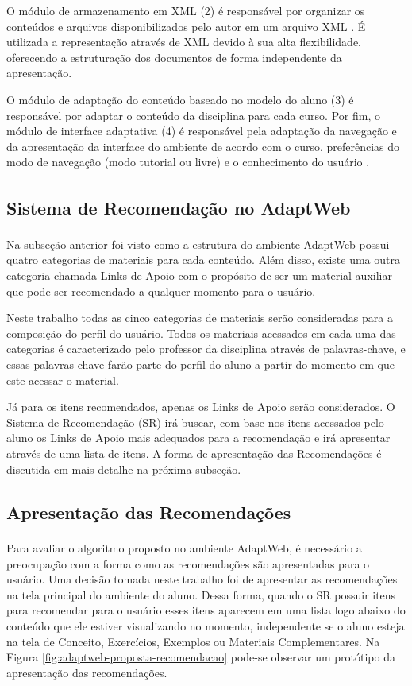 O módulo de armazenamento em XML (2) é responsável por organizar os conteúdos e arquivos disponibilizados pelo autor em
um arquivo XML \cite{gasparini2003interface}. É utilizada a representação através de XML devido à sua alta
flexibilidade, oferecendo a estruturação dos documentos de forma independente da apresentação.

O módulo de adaptação do conteúdo baseado no modelo do aluno (3) é responsável por adaptar o conteúdo da disciplina
para cada curso. Por fim, o módulo de interface adaptativa (4) é responsável pela adaptação da navegação e da
apresentação da interface do ambiente de acordo com o curso, preferências do modo de navegação (modo tutorial ou livre)
e o conhecimento do usuário \cite{gasparini2003interface}.

\subsection{Sistema de Recomendação no AdaptWeb\textsuperscript{\textregistered}}

Na subseção anterior foi visto como a estrutura do ambiente AdaptWeb\textsuperscript{\textregistered} possui quatro categorias
de materiais para cada conteúdo. Além disso, existe uma outra categoria chamada Links de Apoio com o propósito de ser um
material auxiliar que pode ser recomendado a qualquer momento para o usuário.

Neste trabalho todas as cinco categorias de materiais serão consideradas para a composição do perfil do usuário. Todos os
materiais acessados em cada uma das categorias é caracterizado pelo professor da disciplina através de palavras-chave, e
essas palavras-chave farão parte do perfil do aluno a partir do momento em que este acessar o material.

Já para os itens recomendados, apenas os Links de Apoio serão considerados. O Sistema de Recomendação (SR) irá buscar, com
base nos itens acessados pelo aluno os Links de Apoio mais adequados para a recomendação e irá apresentar através de uma
lista de itens. A forma de apresentação das Recomendações é discutida em mais detalhe na próxima subseção.

\subsection{Apresentação das Recomendações}

Para avaliar o algoritmo proposto no ambiente AdaptWeb\textsuperscript{\textregistered}, é necessário a preocupação com a
forma como as recomendações são apresentadas para o usuário. Uma decisão tomada neste trabalho foi de apresentar as
recomendações na tela principal do ambiente do aluno. Dessa forma, quando o SR possuir itens para recomendar para o usuário
esses itens aparecem em uma lista logo abaixo do conteúdo que ele estiver visualizando no momento, independente se o aluno esteja na
tela de Conceito, Exercícios, Exemplos ou Materiais Complementares. Na Figura \ref{fig:adaptweb-proposta-recomendacao}
pode-se observar um protótipo da apresentação das recomendações.

